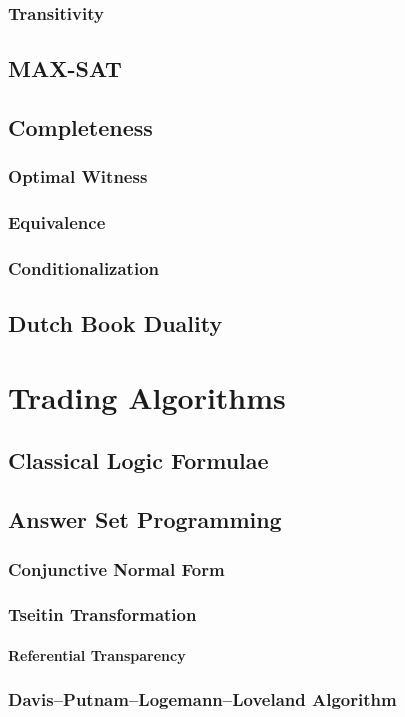 \documentclass[a4paper,11pt]{book}
\begin{document}
\subsection{Transitivity}
\section{MAX-SAT}
\section{Completeness}
\subsection{Optimal Witness}
\subsection{Equivalence}
\subsection{Conditionalization}
\section{Dutch Book Duality}

\chapter{Trading Algorithms}
\section{Classical Logic Formulae}
\section{Answer Set Programming}
\subsection{Conjunctive Normal Form}
\subsection{Tseitin Transformation}
\subsubsection{Referential Transparency}
\subsection{Davis–Putnam–Logemann–Loveland Algorithm}
\end{document}
